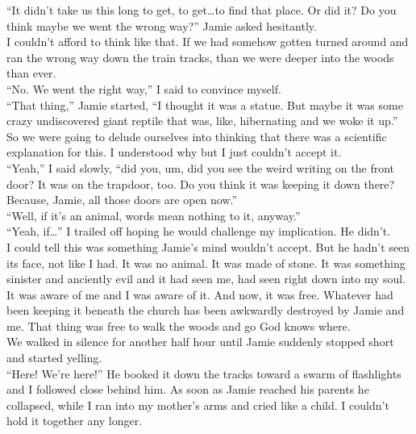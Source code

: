 \documentclass[a5paper]{scrartcl}
\begin{document}
\enquote{It didn't take us this long to get, to get\dots to find that place. Or did it? Do you think maybe we went the wrong way?} Jamie asked hesitantly.\\


I couldn't afford to think like that. If we had somehow gotten turned around and ran the wrong way down the train tracks, than we were deeper into the woods than ever.\\


\enquote{No. We went the right way,} I said to convince myself.\\


\enquote{That thing,} Jamie started, \enquote{I thought it was a statue. But maybe it was some crazy undiscovered giant reptile that was, like, hibernating and we woke it up.}\\


So we were going to delude ourselves into thinking that there was a scientific explanation for this. I understood why but I just couldn't accept it.\\


\enquote{Yeah,} I said slowly, \enquote{did you, um, did you see the weird writing on the front door? It was on the trapdoor, too. Do you think it was keeping it down there? Because, Jamie, all those doors are open now.}\\


\enquote{Well, if it's an animal, words mean nothing to it, anyway.}\\


\enquote{Yeah, if\dots} I trailed off hoping he would challenge my implication. He didn't.\\


I could tell this was something Jamie's mind wouldn't accept. But he hadn't seen its face, not like I had. It was no animal. It was made of stone. It was something sinister and anciently evil and it had seen me, had seen right down into my soul. It was aware of me and I was aware of it. And now, it was free. Whatever had been keeping it beneath the church has been awkwardly destroyed by Jamie and me. That thing was free to walk the woods and go God knows where. \\


We walked in silence for another half hour until Jamie suddenly stopped short and started yelling.\\


\enquote{Here! We're here!} He booked it down the tracks toward a swarm of flashlights and I followed close behind him. As soon as Jamie reached his parents he collapsed, while I ran into my mother's arms and cried like a child. I couldn't hold it together any longer.\\
\end{document}
